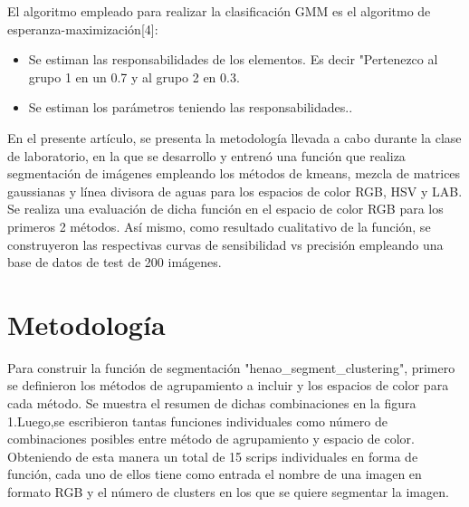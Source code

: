 \documentclass[10pt,twocolumn,letterpaper]{article}
\begin{document}
El algoritmo empleado para realizar la clasificación GMM es el algoritmo de esperanza-maximización[4]:
\begin{itemize}
\item Se estiman las responsabilidades de los elementos. Es decir "Pertenezco al grupo 1 en un 0.7 y al grupo 2 en 0.3.
\item Se estiman los parámetros teniendo las responsabilidades..
\end{itemize}

En el presente artículo, se presenta la metodología llevada a cabo durante la clase de laboratorio, en la que se desarrollo y entrenó una función que realiza segmentación de imágenes empleando los métodos de kmeans, mezcla de matrices gaussianas y línea divisora de aguas para los espacios de color RGB, HSV y LAB. Se realiza una evaluación de dicha función en el espacio de color RGB para los primeros 2 métodos. Así mismo, como resultado cualitativo de la función, se construyeron las respectivas curvas de sensibilidad vs precisión empleando una base de datos de test de 200 imágenes.

\section{Metodología}

Para construir la función de segmentación "henao\_segment\_clustering", primero se definieron los métodos de agrupamiento a incluir y los espacios de color para cada método. Se muestra el resumen de dichas combinaciones en la figura 1.Luego,se escribieron tantas funciones individuales como número de combinaciones posibles entre método de agrupamiento y espacio de color. Obteniendo de esta manera un total de 15 scrips individuales en forma de función, cada uno de ellos tiene como entrada el nombre de una imagen en formato RGB y el número de clusters en los que se quiere segmentar la imagen.
\end{document}

